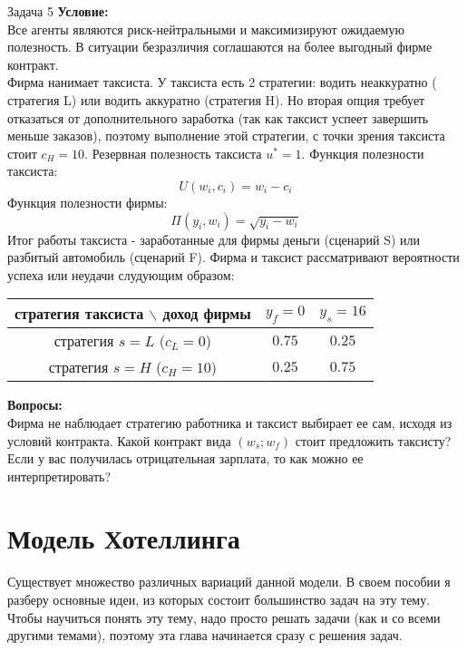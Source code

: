 \begin{mybox}{Задача 5}
\indent\setlength{\parindent}{1em}\textbf{Условие:}\\
    \indent\setlength{\parindent}{1em}Все агенты являются риск-нейтральными и максимизируют ожидаемую полезность. В ситуации безразличия соглашаются на
    более выгодный фирме контракт.\\
    \indent\setlength{\parindent}{1em}Фирма нанимает таксиста. У таксиста есть 2 стратегии: водить неаккуратно (
стратегия L) или водить аккуратно (стратегия H). Но вторая опция
    требует отказаться от дополнительного заработка (так как таксист успеет завершить меньше заказов), поэтому
выполнение этой стратегии, с точки зрения таксиста
    стоит $c_H=10$. Резервная полезность таксиста $u^*=1$. Функция полезности таксиста: $$U(w_i,c_i)=w_i-c_i$$
\indent\setlength{\parindent}{1em}Функция полезности фирмы: $$\Pi(y_i,w_i)=\sqrt{y_i-w_i}$$
    \indent\setlength{\parindent}{1em}Итог работы таксиста - заработанные для фирмы деньги (сценарий
S) или разбитый автомобиль (сценарий F). Фирма и таксист рассматривают вероятности успеха или неудачи слудующим образом:
    \\\begin{center}
    \begin{tabular}{ c|c|c }
     стратегия таксиста $\backslash$ доход фирмы & $y_f=0$ & $y_s=16$ \\
     \hline
     стратегия $s=L$ ($c_L=0$) & $0.75$ & $0.25$ \\
     \hline
     стратегия $s=H$ ($c_H=10$) & $0.25$ & $0.75$ \\
    \end{tabular}
    \end{center}
    \indent\setlength{\parindent}{1em}\textbf{Вопросы:}\\
    \indent\setlength{\parindent}{1em}Фирма не наблюдает стратегию работника и таксист
    выбирает ее сам, исходя из условий контракта. Какой контракт вида $(w_s;w_f)$ стоит предложить таксисту? Если у
вас получилась отрицательная зарплата, то как можно ее интерпретировать?\\
\end{mybox}


\chapter{Модель Хотеллинга}
\indent\setlength{\parindent}{1em}\indent\setlength{\parindent}{1em}Существует множество различных вариаций данной модели. В своем пособии я разберу
основные идеи, из которых состоит большинство задач на эту тему. Чтобы научиться понять эту тему, надо просто решать
задачи (как и со всеми другими темами), поэтому эта глава начинается сразу с решения задач.
